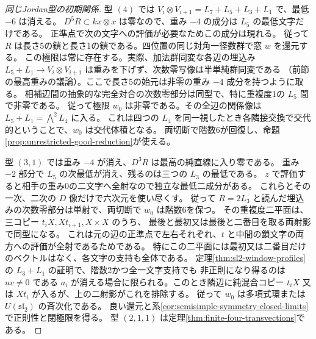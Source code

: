 \begin{proof}[同じJordan型の初期関係]
型 $(4)$ では $V_i\otimes V_{i+1}=L_7+L_5+L_3+L_1$ で、最低 $-6$ は消える。
$D^5 R\subset kx\otimes x$ は零なので、重み $-4$ の成分は $L_5$ の最低文字だけである。
正準点で次の文字への評価が必要なためこの成分は現れる。
従って $R$ は長さ5の鎖と長さ1の鎖である。四位置の同じ対角一径数群で窓 $w$ を還元する。
この極限は常に存在する。実際、加法群同変な各辺の埋込み
$L_5+L_1\to V_i\otimes V_{i+1}$ は重みを下げず、次数零写像は半単純群同変である
（前節の最高重みの議論）。ここで長さ5の始元は非零の重み $-4$ 成分を持つように取る。
相補辺間の抽象的な完全対合の次数零部分は同型で、特に重複度1の $L_5$ 間で非零である。
従って極限 $w_0$ は非零である。その全辺の関係像は $L_5+L_1=\bigwedge^2 L_4$ に入る。
これは四つの $L_4$ を同一視したとき各隣接交換で交代的ということで、$w_0$ は交代体積となる。
両切断で階数6が回復し、命題\ref{prop:unrestricted-good-reduction}が使える。

型 $(3,1)$ では重み $-4$ が消え、$D^3 R$ は最高の純直線に入り零である。
重み $-2$ 部分で $L_5$ の次最低が消え、残るのは三つの $L_3$ の最低である。
$z$ で評価すると相手の重み0の二文字へ全射なので独立な最低二成分がある。
これらとその一次、二次の $D$ 像だけで六次元を使い尽くす。
従って $R=2L_3$ と読んだ埋込みの次数零部分は単射で、両切断で $w_0$ は階数6を保つ。
その重複度二平面は、三コピー $t_i X,Xt_{i+1},X\times X$ のうち、
最後と最初又は最後と二番目を取る両射影で同型になる。
これは元の辺の正準点で左右それぞれ、$t$ と中間の鎖文字の両方への評価が全射であるためである。
特にこの二平面には最初又は二番目だけのベクトルはなく、各文字の支持も全体である。
定理\ref{thm:sl2-window-profiles}の $L_3+L_1$ の証明で、階数2かつ全一文字支持でも
非正則になり得るのは $uv\ne0$ である $a_i$ が消える場合に限られる。このとき隣辺に純混合コピー
$t_i X$ 又は $X t_i$ が入るが、上の二射影がこれを排除する。
従って $w_0$ は多項式環または $U(\mathfrak{sl}_2)$ の斉次化である。
良い還元と系\ref{cor:semisimple-symmetry-closed-limits}で正則性と閉極限を得る。
型 $(2,1,1)$ は定理\ref{thm:finite-four-transvections}である。
\end{proof}

